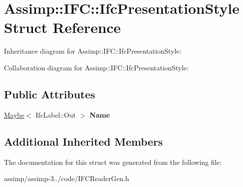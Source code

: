 \hypertarget{struct_assimp_1_1_i_f_c_1_1_ifc_presentation_style}{\section{Assimp\+:\+:I\+F\+C\+:\+:Ifc\+Presentation\+Style Struct Reference}
\label{struct_assimp_1_1_i_f_c_1_1_ifc_presentation_style}
}


Inheritance diagram for Assimp\+:\+:I\+F\+C\+:\+:Ifc\+Presentation\+Style\+:


Collaboration diagram for Assimp\+:\+:I\+F\+C\+:\+:Ifc\+Presentation\+Style\+:
\subsection*{Public Attributes}
\begin{DoxyCompactItemize}
\item 
\hypertarget{struct_assimp_1_1_i_f_c_1_1_ifc_presentation_style_a3d7ab4d0e4d445be16f1df4db341562d}{\hyperlink{struct_assimp_1_1_s_t_e_p_1_1_maybe}{Maybe}$<$ Ifc\+Label\+::\+Out $>$ {\bfseries Name}}\label{struct_assimp_1_1_i_f_c_1_1_ifc_presentation_style_a3d7ab4d0e4d445be16f1df4db341562d}

\end{DoxyCompactItemize}
\subsection*{Additional Inherited Members}


The documentation for this struct was generated from the following file\+:\begin{DoxyCompactItemize}
\item 
assimp/assimp-\/3../code/I\+F\+C\+Reader\+Gen.\+h\end{DoxyCompactItemize}

